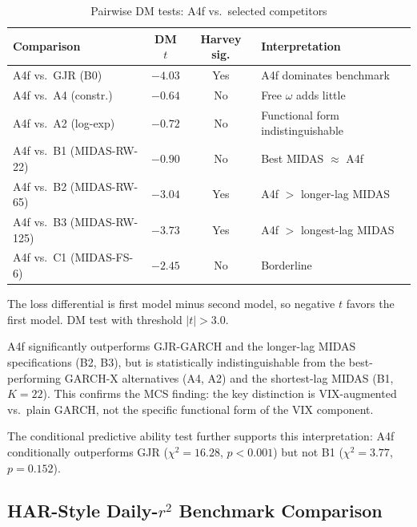 \documentclass[12pt,a4paper]{article}
\begin{document}
\begin{table}[H]
\centering
\caption{Pairwise DM tests: A4f vs.\ selected competitors}
\label{tab:pairwise_dm}
\begin{threeparttable}
\small
\begin{tabular}{@{}lccl@{}}
\toprule
Comparison & DM $t$ & Harvey sig. & Interpretation \\
\midrule
A4f vs.\ GJR (B0) & $-4.03$ & Yes & A4f dominates benchmark \\
A4f vs.\ A4 (constr.) & $-0.64$ & No & Free $\omega$ adds little \\
A4f vs.\ A2 (log-exp) & $-0.72$ & No & Functional form indistinguishable \\
A4f vs.\ B1 (MIDAS-RW-22) & $-0.90$ & No & Best MIDAS $\approx$ A4f \\
A4f vs.\ B2 (MIDAS-RW-65) & $-3.04$ & Yes & A4f $>$ longer-lag MIDAS \\
A4f vs.\ B3 (MIDAS-RW-125) & $-3.73$ & Yes & A4f $>$ longest-lag MIDAS \\
A4f vs.\ C1 (MIDAS-FS-6) & $-2.45$ & No & Borderline \\
\bottomrule
\end{tabular}
\begin{tablenotes}
\footnotesize
\item The loss differential is first model minus second model, so negative $t$ favors the first model. DM test with \citet{harvey2016} threshold $|t| > 3.0$.
\end{tablenotes}
\end{threeparttable}
\end{table}

A4f significantly outperforms GJR-GARCH and the longer-lag MIDAS specifications (B2, B3), but is statistically indistinguishable from the best-performing GARCH-X alternatives (A4, A2) and the shortest-lag MIDAS (B1, $K=22$). This confirms the MCS finding: the key distinction is VIX-augmented vs.\ plain GARCH, not the specific functional form of the VIX component.

The \citet{giacomini2006} conditional predictive ability test further supports this interpretation: A4f conditionally outperforms GJR ($\chi^2 = 16.28$, $p < 0.001$) but not B1 ($\chi^2 = 3.77$, $p = 0.152$).

\subsection{HAR-Style Daily-$r^2$ Benchmark Comparison}
\label{sec:har_rv_benchmark}
\end{document}
